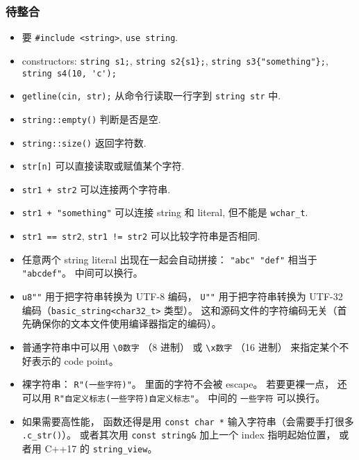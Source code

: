 
\begin{issues}
\issueDraft
\end{issues}

\subsubsection{待整合}
\begin{itemize}
\item 要 \verb`#include <string>`, \verb`use string`.
\item constructors: \verb`string s1;`, \verb`string s2{s1};`, \verb`string s3{"something"};`, \verb`string s4(10, 'c');`
\item \verb`getline(cin, str);` 从命令行读取一行字到 \verb`string str` 中.
\item \verb`string::empty()` 判断是否是空.
\item \verb`string::size()` 返回字符数.
\item \verb`str[n]` 可以直接读取或赋值某个字符.
\item \verb`str1 + str2` 可以连接两个字符串.
\item \verb`str1 + "something"` 可以连接 string 和 literal, 但不能是 \verb`wchar_t`.
\item \verb`str1 == str2`, \verb`str1 != str2` 可以比较字符串是否相同.
\item 任意两个 string literal 出现在一起会自动拼接： \verb`"abc" "def"` 相当于 \verb|"abcdef"|。 中间可以换行。
\item \verb|u8""| 用于把字符串转换为 UTF-8 编码， \verb|U""| 用于把字符串转换为 UTF-32 编码（\verb|basic_string<char32_t>| 类型）。 这和源码文件的字符编码无关（首先确保你的文本文件使用编译器指定的编码）。
\item 普通字符串中可以用 \verb|\0数字| （8 进制） 或 \verb|\x数字| （16 进制） 来指定某个不好表示的 code point。
\item 裸字符串： \verb|R"(一些字符)"|。 里面的字符不会被 escape。 若要更裸一点， 还可以用 \verb|R"自定义标志(一些字符)自定义标志"|。 中间的 \verb|一些字符| 可以换行。
\item 如果需要高性能， 函数还得是用 \verb|const char *| 输入字符串（会需要手打很多 \verb|.c_str()|）。 或者其次用 \verb|const string&| 加上一个 index 指明起始位置， 或者用 C++17 的 \verb|string_view|。
\end{itemize}

